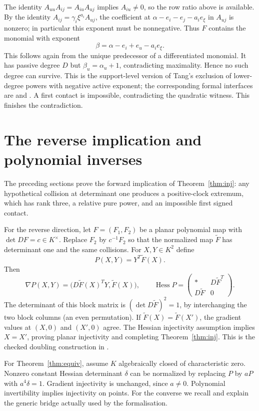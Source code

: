 \documentclass[11pt,a4paper]{article}
\newcommand{\Hess}{\operatorname{Hess}}
\begin{document}
The identity $A_{uu}A_{ij}=A_{iu}A_{uj}$ implies $A_{iu}\ne0$, so the row ratio above is available. By the identity $A_{ij}=\gamma_i\xi^{a_i}A_{uj}$, the coefficient at $\alpha-e_i-e_j-a_i e_\xi$ in $A_{uj}$ is nonzero; in particular this exponent must be nonnegative. Thus $F$ contains the monomial with exponent
\[
 \beta=\alpha-e_i+e_u-a_i e_\xi.
\]
This follows again from the unique predecessor of a differentiated monomial. It has passive degree $D$ but $\beta_u=\alpha_u+1$, contradicting maximality. Hence no such degree can survive. This is the support-level version of Tang's exclusion of lower-degree powers with negative active exponent; the corresponding formal interfaces are  and . A first contact is impossible, contradicting the quadratic witness. This finishes the contradiction.


\section{The reverse implication and polynomial inverses}\label{sec:inverse}
The preceding sections prove the forward implication of Theorem~\ref{thm:inj}: any hypothetical collision at determinant one produces a positive-clock extremum, which has rank three, a relative pure power, and an impossible first signed contact.

For the reverse direction, let $F=(F_1,F_2)$ be a planar polynomial map with $\det DF=c\in K^\times$. Replace $F_2$ by $c^{-1}F_2$ so that the normalized map $\widetilde F$ has determinant one and the same collisions. For $X,Y\in K^2$ define
\[
 P(X,Y)=Y^T\widetilde F(X).
\]
Then
\[
 \nabla P(X,Y)=\bigl(D\widetilde F(X)^TY,\widetilde F(X)\bigr),\qquad
 \Hess P=
 \begin{pmatrix}
 *&D\widetilde F^T\\D\widetilde F&0
 \end{pmatrix}.
\]
The determinant of this block matrix is $(\det D\widetilde F)^2=1$, by interchanging the two block columns (an even permutation). If $\widetilde F(X)=\widetilde F(X')$, the gradient values at $(X,0)$ and $(X',0)$ agree. The Hessian injectivity assumption implies $X=X'$, proving planar injectivity and completing Theorem~\ref{thm:inj}. This is the checked doubling construction in .

For Theorem~\ref{thm:equiv}, assume $K$ algebraically closed of characteristic zero. Nonzero constant Hessian determinant $\delta$ can be normalized by replacing $P$ by $aP$ with $a^4\delta=1$. Gradient injectivity is unchanged, since $a\ne0$. Polynomial invertibility implies injectivity on points. For the converse we recall and explain the generic bridge actually used by the formalisation.
\end{document}

